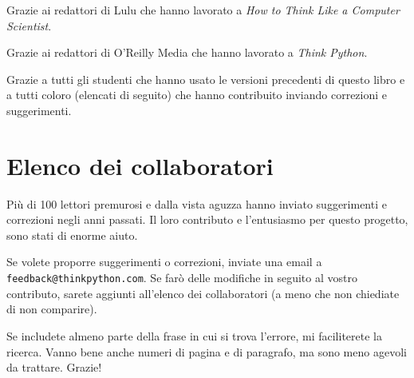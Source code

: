 \documentclass[10pt]{book}
\begin{document}
Grazie ai redattori di Lulu che hanno lavorato a
{\em How to Think Like a Computer Scientist}.

Grazie ai redattori di O'Reilly Media che hanno lavorato a
{\em Think Python}.

Grazie a tutti gli studenti che hanno usato le versioni precedenti di questo libro e a tutti coloro (elencati di seguito) che hanno contribuito inviando correzioni e suggerimenti.


\section*{Elenco dei collaboratori}

Più di 100 lettori premurosi e dalla vista aguzza hanno inviato suggerimenti e correzioni negli anni passati. Il loro contributo e l'entusiasmo per questo progetto, sono stati di enorme aiuto.

Se volete proporre suggerimenti o correzioni, inviate una email a 
{\tt feedback@thinkpython.com}. Se farò delle modifiche in seguito al vostro contributo, sarete aggiunti all'elenco dei collaboratori (a meno che non chiediate di non comparire).

Se includete almeno parte della frase in cui si trova l'errore, mi faciliterete la ricerca. Vanno bene anche numeri di pagina e di paragrafo, ma sono meno agevoli da trattare. Grazie!
\end{document}
